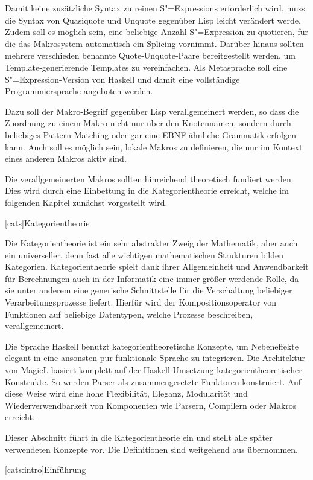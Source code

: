 \documentclass[12pt, a4paper, bibgerm]{scrbook}
\newcommand\lchapter{}
\newcommand\lsection{}
\newcommand{\sexp}{S"=Expression}
\newcommand{\sexps}{S"=Expressions}
\begin{document}
Damit keine zusätzliche Syntax zu reinen \sexps{} erforderlich wird,
muss die Syntax von Quasiquote und Unquote gegenüber Lisp leicht
verändert werde. Zudem soll es möglich sein, eine beliebige Anzahl
\sexp{} zu quotieren, für die das Makrosystem automatisch ein Splicing
vornimmt. Darüber hinaus sollten mehrere verschieden benannte
Quote-Unquote-Paare bereitgestellt werden, um Template-generierende
Templates zu vereinfachen. Als Metasprache soll eine \sexp{}-Version
von Haskell und damit eine vollständige Programmiersprache
angeboten werden.

Dazu soll der Makro-Begriff gegenüber Lisp verallgemeinert werden, so
dass die Zuordnung zu einem Makro nicht nur über den Knotennamen,
sondern durch beliebiges Pattern-Matching oder gar eine EBNF-ähnliche
Grammatik erfolgen kann. Auch soll es möglich sein, lokale Makros zu
definieren, die nur im Kontext eines anderen Makros aktiv sind.  

Die verallgemeinerten Makros sollten hinreichend theoretisch fundiert
werden. Dies wird durch eine Einbettung in die Kategorientheorie
erreicht, welche im folgenden Kapitel zunächst vorgestellt wird.

\lchapter[cats]{Kategorientheorie}

Die Kategorientheorie ist ein sehr abstrakter Zweig der Mathematik,
aber auch ein universeller, denn fast alle wichtigen mathematischen
Strukturen bilden Kategorien. Kategorientheorie spielt dank ihrer
Allgemeinheit und Anwendbarkeit für Berechnungen auch in der Informatik
eine immer größer werdende Rolle, da sie unter anderem eine generische
Schnittstelle für die Verschaltung beliebiger Verarbeitungsprozesse
liefert. Hierfür wird der Kompositionsoperator von Funktionen auf
beliebige Datentypen, welche Prozesse beschreiben, verallgemeinert.

Die Sprache Haskell benutzt kategorientheoretische Konzepte, um
Nebeneffekte elegant in eine ansonsten pur funktionale Sprache zu
integrieren. Die Architektur von MagicL basiert komplett auf der
Haskell-Umsetzung kategorientheoretischer Konstrukte. So werden Parser
als zusammengesetzte Funktoren konstruiert. Auf diese Weise wird eine
hohe Flexibilität, Eleganz, Modularität und Wiederverwendbarkeit von
Komponenten wie Parsern, Compilern oder Makros erreicht.

Dieser Abschnitt führt in die Kategorientheorie ein und
stellt alle später verwendeten Konzepte vor. Die Definitionen sind
weitgehend aus \cite{Grundlagen} übernommen.

\lsection[cats:intro]{Einführung}
\end{document}
